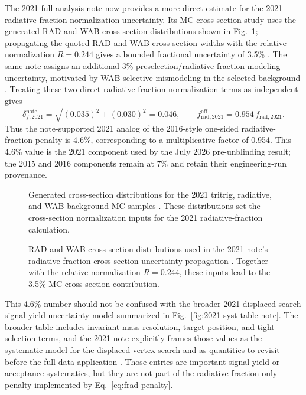 The 2021 full-analysis note now provides a more direct estimate for the 2021
radiative-fraction normalization uncertainty. Its MC cross-section study uses the
generated RAD and WAB cross-section distributions shown in
Fig.~\ref{fig:2021-radfrac-xsec-note}; propagating the quoted RAD and WAB
cross-section widths with the relative normalization $R=0.244$ gives a bounded
fractional uncertainty of 3.5\% \cite[Sec.~9.1, Fig.~161]{HPS2021FullAnalysisNote}.
The same note assigns an additional 3\% preselection/radiative-fraction modeling
uncertainty, motivated by WAB-selective mismodeling in the selected background
\cite[Sec.~9.2]{HPS2021FullAnalysisNote}. Treating these two direct
radiative-fraction normalization terms as independent gives
\begin{equation}
\delta_{f,2021}^{\mathrm{note}}
= \sqrt{(0.035)^2 + (0.030)^2}
= 0.046,
\qquad
f_{\mathrm{rad},2021}^{\mathrm{eff}}
= 0.954\,f_{\mathrm{rad},2021}.
\label{eq:frad-2021-note-penalty}
\end{equation}
Thus the note-supported 2021 analog of the 2016-style one-sided radiative-fraction
penalty is 4.6\%, corresponding to a multiplicative factor of 0.954. This 4.6\% value
is the 2021 component used by the July 2026 pre-unblinding result; the 2015 and 2016
components remain at 7\% and retain their engineering-run provenance.

\begin{figure}[H]
\centering
{}
\caption{Generated cross-section distributions for the 2021 tritrig, radiative, and
WAB background MC samples \cite{HPS2021FullAnalysisNote}. These distributions set the
cross-section normalization inputs for the 2021 radiative-fraction calculation.}
\label{fig:2021-radfrac-xsec-note}
\end{figure}

\begin{figure}[H]
\centering
{}
\caption{RAD and WAB cross-section distributions used in the 2021 note's
radiative-fraction cross-section uncertainty propagation \cite{HPS2021FullAnalysisNote}.
Together with the relative normalization $R=0.244$, these inputs lead to the 3.5\%
MC cross-section contribution.}
\label{fig:2021-radfrac-xsec-syst-note}
\end{figure}

This 4.6\% number should not be confused with the broader 2021 displaced-search
signal-yield uncertainty model summarized in Fig.~\ref{fig:2021-syst-table-note}. The
broader table includes invariant-mass resolution, target-position, and tight-selection
terms, and the 2021 note explicitly frames those values as the systematic model for
the displaced-vertex search and as quantities to revisit before the full-data
application \cite[Sec.~9, Table~58]{HPS2021FullAnalysisNote}. Those entries are
important signal-yield or acceptance systematics, but they are not part of the
radiative-fraction-only penalty implemented by Eq.~\eqref{eq:frad-penalty}.

